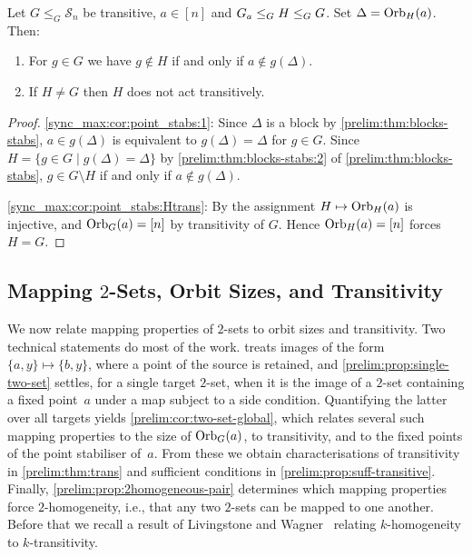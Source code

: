 \begin{corollary}
	\label{sync_max:cor:point_stabs}
	Let $G \le_G \mathcal S_n$ be transitive, $a \in [n]$ and $\Stab{a}{G} \le_G H \le_G G$.
	Set $\Delta = \Orbit{a}{H}$. Then:
	\begin{enumerate}
		\item \label{sync_max:cor:point_stabs:1} For $g \in G$ we have $g \notin H$ if and only if $a \notin g(\Delta)$.
		\item \label{sync_max:cor:point_stabs:Htrans} If $H \ne G$ then $H$ does not act transitively.
	\end{enumerate}
\end{corollary}
\begin{proof}
	\ref{sync_max:cor:point_stabs:1}: 
	Since $\Delta$ is a block by \cref{prelim:thm:blocks-stabs}, $a \in g(\Delta)$
	is equivalent to $g(\Delta) = \Delta$ for $g \in G$.
	Since $H = \{ g\in G \mid g(\Delta) = \Delta \}$
	by \cref{prelim:thm:blocks-stabs:2} of \cref{prelim:thm:blocks-stabs},
	$g \in G \setminus H$ if and only if $a \notin g(\Delta)$.
	
	\ref{sync_max:cor:point_stabs:Htrans}: By
	 the assignment
	$H \mapsto \Orbit{a}{H}$ is injective, and $\Orbit{a}{G} = [n]$ by transitivity of $G$.
	Hence $\Orbit{a}{H} = [n]$ forces $H = G$.
\end{proof}

\subsection{Mapping $2$-Sets, Orbit Sizes, and Transitivity}
\label{prelim:perm:subsec:mapping-orbit}

We now relate mapping properties of $2$-sets to orbit sizes and transitivity.
Two technical statements do most of the work.
 treats images of the form $\{a,y\} \mapsto \{b,y\}$,
where a point of the source is retained, and
\cref{prelim:prop:single-two-set} settles, for a single target $2$-set, when it is the image of a
$2$-set containing a fixed point~$a$ under a map subject to a side condition.
Quantifying the latter over all targets yields \cref{prelim:cor:two-set-global}, which relates
several such mapping properties to the size of $\Orbit{a}{G}$, to transitivity, and to the fixed
points of the point stabiliser of~$a$.
From these we obtain characterisations of transitivity in \cref{prelim:thm:trans} and
sufficient conditions in \cref{prelim:prop:suff-transitive}.
Finally, \cref{prelim:prop:2homogeneous-pair} determines which mapping properties force
$2$-homogeneity, i.e., that any two $2$-sets can be mapped to one another.
Before that we recall a result of Livingstone and Wagner~\cite{Livingstone1965} relating
$k$-homogeneity to $k$-transitivity.

